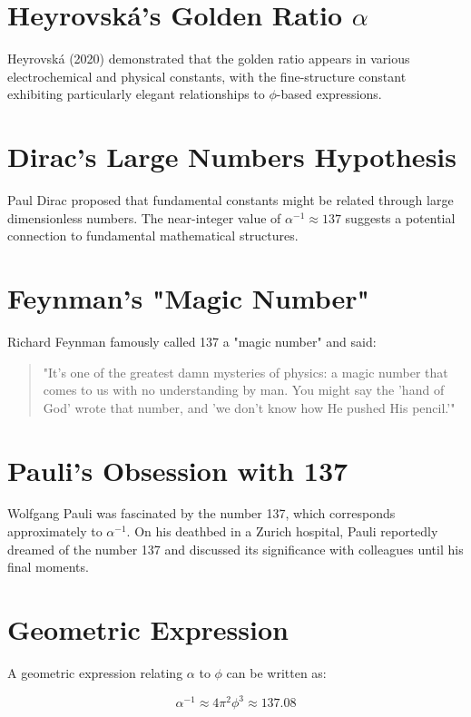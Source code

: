 \section{Heyrovsk\'a's Golden Ratio $\alpha$}

Heyrovsk\'a (2020) demonstrated that the golden ratio appears in various electrochemical and physical constants, with the fine-structure constant exhibiting particularly elegant relationships to $\phi$-based expressions.

\section{Dirac's Large Numbers Hypothesis}

Paul Dirac proposed that fundamental constants might be related through large dimensionless numbers. The near-integer value of $\alpha^{-1} \approx 137$ suggests a potential connection to fundamental mathematical structures.

\section{Feynman's "Magic Number"}

Richard Feynman famously called 137 a "magic number" and said:

\begin{quote}
"It's one of the greatest damn mysteries of physics: a magic number that comes to us with no understanding by man. You might say the 'hand of God' wrote that number, and 'we don't know how He pushed His pencil.'"
\end{quote}

\section{Pauli's Obsession with 137}

Wolfgang Pauli was fascinated by the number 137, which corresponds approximately to $\alpha^{-1}$. On his deathbed in a Zurich hospital, Pauli reportedly dreamed of the number 137 and discussed its significance with colleagues until his final moments.

\section{Geometric Expression}

A geometric expression relating $\alpha$ to $\phi$ can be written as:

\begin{equation}
\alpha^{-1} \approx 4\pi^2\phi^3 \approx 137.08
\end{equation}

